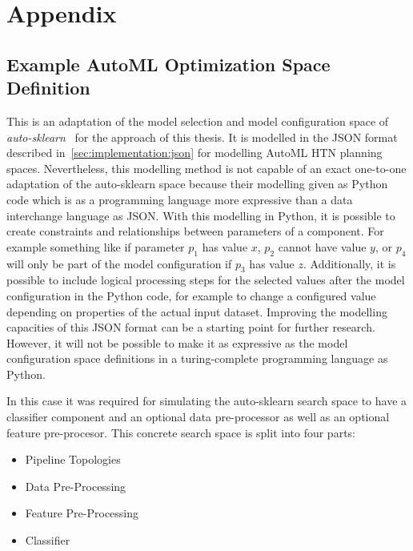%
\chapter{Appendix}
\label{sec:appendix}

\section{Example AutoML Optimization Space Definition}
\label{sec:appendix:htn-space}
This is an adaptation of the model selection and model configuration space of \textit{auto-sklearn}~\cite{Feurer-AutoSklearn} for the approach of this thesis.
It is modelled in the JSON format described in~\ref{sec:implementation:json} for modelling AutoML HTN planning spaces.\newline
Nevertheless, this modelling method is not capable of an exact one-to-one adaptation of the auto-sklearn space because their modelling given as Python code which is as a programming language more expressive than a data interchange language as JSON.
With this modelling in Python, it is possible to create constraints and relationships between parameters of a component.
For example something like if parameter $p_1$ has value $x$, $p_2$ cannot have value $y$, or $p_4$ will only be part of the model configuration if $p_3$ has value $z$.
Additionally, it is possible to include logical processing steps for the selected values after the model configuration in the Python code, for example to change a configured value depending on properties of the actual input dataset.\newline
Improving the modelling capacities of this JSON format can be a starting point for further research.
However, it will not be possible to make it as expressive as the model configuration space definitions in a turing-complete programming language as Python.

In this case it was required for simulating the auto-sklearn search space to have a classifier component and an optional data pre-processor as well as an optional feature pre-procesor.
This concrete search space is split into four parts:
\begin{itemize}
    \item Pipeline Topologies
    \item Data Pre-Processing
    \item Feature Pre-Processing
    \item Classifier
\end{itemize}


